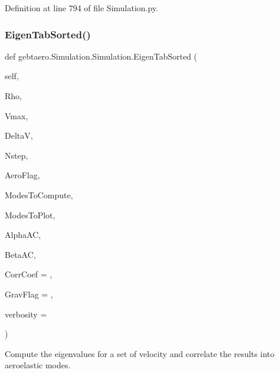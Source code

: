 Definition at line 794 of file Simulation.\+py.

\mbox{\label{classgebtaero_1_1_simulation_1_1_simulation_ae64bf3c9cef715d9d999acef888a840e}} 
\subsubsection{\texorpdfstring{Eigen\+Tab\+Sorted()}{EigenTabSorted()}}
{\footnotesize\ttfamily def gebtaero.\+Simulation.\+Simulation.\+Eigen\+Tab\+Sorted (\begin{DoxyParamCaption}\item[{}]{self,  }\item[{}]{Rho,  }\item[{}]{Vmax,  }\item[{}]{DeltaV,  }\item[{}]{Nstep,  }\item[{}]{Aero\+Flag,  }\item[{}]{Modes\+To\+Compute,  }\item[{}]{Modes\+To\+Plot,  }\item[{}]{Alpha\+AC,  }\item[{}]{Beta\+AC,  }\item[{}]{Corr\+Coef = {},  }\item[{}]{Grav\+Flag = {},  }\item[{}]{verbosity = {} }\end{DoxyParamCaption})}



Compute the eigenvalues for a set of velocity and correlate the results into aeroelastic modes. 


